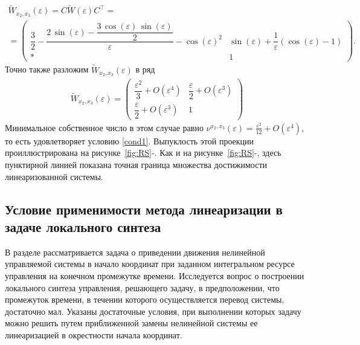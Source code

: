 \documentclass[../main.tex]{subfiles}
\begin{document}
\begin{enumerate}
\begin{gather*}
			\widetilde{W}_{x_2,x_3}(\varepsilon) =  C \widetilde{W} (\varepsilon) C^{\top}  =\\=\begin{pmatrix}
				\dfrac{3}{2}-\dfrac{2\,\sin\left(\varepsilon \right)-\dfrac{3\,\cos\left(\varepsilon \right)\,\sin\left(\varepsilon \right)}{2}}{\varepsilon }-{\cos\left(\varepsilon \right)}^2 & \sin\left(\varepsilon \right)+\dfrac{1}{\varepsilon } \left(\cos\left(\varepsilon \right)-1 \right)\\[8pt]
				* & 
				1 
			\end{pmatrix}.
		\end{gather*}
		Точно также разложим $ \widetilde{W}_{x_2,x_3}(\varepsilon) $ в ряд
		\begin{gather*}
			\widetilde{W}_{x_2,x_3}(\varepsilon)  = \begin{pmatrix}
				\dfrac{\varepsilon^2}{3} + O(\varepsilon^4) &
				\dfrac{\varepsilon }{2} + O(\varepsilon^3) \\[8pt]
				\dfrac{\varepsilon }{2} + O(\varepsilon^3) & 1
			\end{pmatrix}
		\end{gather*}
		Минимальное собственное число в этом случае равно $ \nu^{x_2,x_3}(\varepsilon) = \frac{\varepsilon^2}{12} + O(\varepsilon^4) $, то есть удовлетворяет условию \eqref{cond1}. Выпуклость этой проекции проиллюстрирована на рисунке~\ref{fig:RS}-.  Как и на рисунке~\ref{fig:RS}-, здесь пунктирной линией показана точная граница множества достижимости линеаризованной системы.
	\end{enumerate}
	\subsection{Условие применимости метода линеаризации в задаче локального синтеза} 
	В  разделе рассматривается задача о  приведении движения нелинейной управляемой системы в начало координат при заданном интегральном ресурсе управления на конечном промежутке времени. Исследуется вопрос о  построении локального синтеза управления, решающего задачу, в предположении, что промежуток времени, в течении которого осуществляется перевод системы, достаточно мал. Указаны достаточные условия, при выполнении которых задачу можно решить путем приближенной замены нелинейной системы ее линеаризацией в окрестности начала координат.
\end{document}
